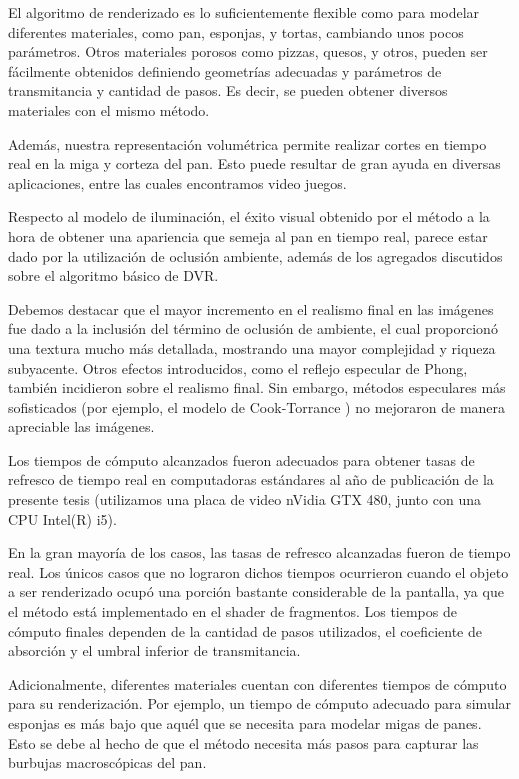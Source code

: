 
El algoritmo de renderizado es lo suficientemente flexible como para modelar diferentes materiales, como pan, esponjas, y tortas, cambiando unos pocos parámetros.
Otros materiales porosos como pizzas, quesos, y otros, pueden ser fácilmente obtenidos definiendo geometrías adecuadas y parámetros de transmitancia y cantidad de pasos.
Es decir, se pueden obtener diversos materiales con el mismo método.

Además, nuestra representación volumétrica permite realizar cortes en tiempo real en la miga y corteza del pan.
Esto puede resultar de gran ayuda en diversas aplicaciones, entre las cuales encontramos video juegos.

Respecto al modelo de iluminación, el éxito visual obtenido por el método a la hora de obtener una apariencia que semeja al pan en tiempo real, parece estar dado por la utilización de oclusión ambiente, además de los agregados discutidos sobre el algoritmo básico de DVR.

Debemos destacar que el mayor incremento en el realismo final en las imágenes fue dado a la inclusión del término de oclusión de ambiente, el cual proporcionó una textura mucho más detallada, mostrando una mayor complejidad y riqueza subyacente.
Otros efectos introducidos, como el reflejo especular de Phong, también incidieron sobre el realismo final.
Sin embargo, métodos especulares más sofisticados (por ejemplo, el modelo de Cook-Torrance \cite{Cook1982}) no mejoraron de manera apreciable las imágenes.


Los tiempos de cómputo alcanzados fueron adecuados para obtener tasas de refresco de tiempo real en computadoras estándares al año de publicación de la presente tesis (utilizamos una placa de video nVidia GTX 480, junto con una CPU Intel(R) i5).

En la gran mayoría de los casos, las tasas de refresco alcanzadas fueron de tiempo real.
Los únicos casos que no lograron dichos tiempos ocurrieron cuando el objeto a ser renderizado ocupó una porción bastante considerable de la pantalla, ya que el método está implementado en el shader de fragmentos.
Los tiempos de cómputo finales dependen de la cantidad de pasos utilizados, el coeficiente de absorción y el umbral inferior de transmitancia.

Adicionalmente, diferentes materiales cuentan con diferentes tiempos de cómputo para su renderización.
Por ejemplo, un tiempo de cómputo adecuado para simular esponjas es más bajo que aquél que se necesita para modelar migas de panes.
Esto se debe al hecho de que el método necesita más pasos para capturar las burbujas macroscópicas del pan.

